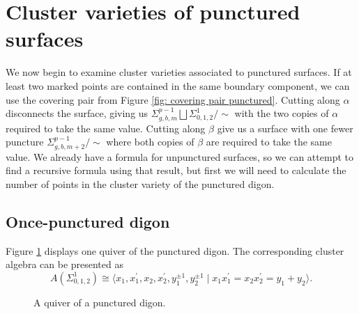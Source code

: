\documentclass[reqno,12pt]{amsart}
\theoremstyle{definition}
\theoremstyle{remark}
\theoremstyle{remark}
\numberwithin{equation}{section}
\begin{document}
\section{Cluster varieties of punctured surfaces}\label{section: punctured surfaces}

We now begin to examine cluster varieties associated to punctured surfaces. If at least two marked points are contained in the same boundary component, we can use the covering pair from Figure \ref{fig: covering pair punctured}. Cutting along $\alpha$ disconnects the surface, giving us $\Sigma_{g,b,m}^{p-1} \bigsqcup \Sigma_{0,1,2}^1 /\!\sim$ with the two copies of $\alpha$ required to take the same value. Cutting along $\beta$ give us a surface with one fewer puncture $\Sigma_{g,b,m+2}^{p-1}/\!\sim$ where both copies of $\beta$ are required to take the same value.
We already have a formula for unpunctured surfaces, so we can attempt to find a recursive formula using that result, but first we will need to calculate the number of points in the cluster variety of the punctured digon. 

\subsection{Once-punctured digon}

Figure \ref{fig: punctured digon quiver} displays one quiver of the punctured digon. The corresponding cluster algebra can be presented as \[ A(\Sigma_{0,1,2}^1) \cong \langle x_1, x_1^\prime, x_2, x_2^\prime, y_1^{\pm 1}, y_2^{\pm 1} \;|\; x_1 x_1^\prime = x_2 x_2^\prime = y_1 + y_2 \rangle. \]

\begin{figure}[ht]
    \centering
    \caption{A quiver of a punctured digon.}
    \label{fig: punctured digon quiver}
\end{figure} 
\end{document}
